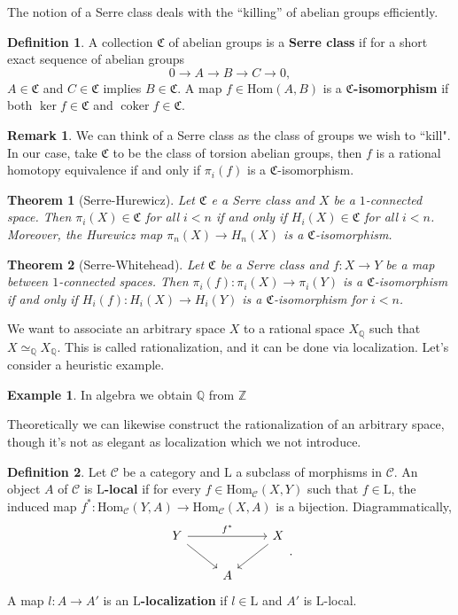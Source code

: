 \documentclass[psamsfonts]{amsart}
\newtheorem{thm}{Theorem}[section]
\theoremstyle{definition}
\newtheorem{defn}{Definition}[section]
\newtheorem{exmp}{Example}[section]
\newtheorem{rem}{Remark}[section]
\newcommand{\Q}{\mathbb{Q}}
\newcommand{\Z}{\mathbb{Z}}
\newcommand{\Hom}{\mathrm{Hom}}
\DeclareMathOperator{\coker}{coker}
\numberwithin{equation}{section}
\begin{document}
The notion of a Serre class deals with the ``killing'' of abelian groups efficiently.

\begin{defn}
A collection $\mathfrak{C}$ of abelian groups is a \textbf{Serre class} if for a short exact sequence of abelian groups
\[0\rightarrow A\to B\to C\to0,\]
$A\in\mathfrak{C}$ and $C\in\mathfrak{C}$ implies $B\in\mathfrak{C}$. A map $f\in\Hom(A,B)$ is a \textbf{$\mathfrak{C}$-isomorphism} if both $\ker f\in\mathfrak{C}$ and $\coker f\in\mathfrak{C}$.
\end{defn}

\begin{rem}
We can think of a Serre class as the class of groups we wish to ``kill". In our case, take $\mathfrak{C}$ to be the class of torsion abelian groups, then $f$ is a rational homotopy equivalence if and only if $\pi_i(f)$ is a $\mathfrak{C}$-isomorphism.
\end{rem}

\begin{thm}[Serre-Hurewicz]
Let $\mathfrak{C}$ e a Serre class and $X$ be a $1$-connected space. Then $\pi_i(X)\in\mathfrak{C}$ for all $i<n$ if and only if $H_i(X)\in\mathfrak{C}$ for all $i<n$. Moreover, the Hurewicz map $\pi_n(X)\to H_n(X)$ is a $\mathfrak{C}$-isomorphism.
\end{thm}

\begin{thm}[Serre-Whitehead]
Let $\mathfrak{C}$ be a Serre class and $f:X\to Y$ be a map between $1$-connected spaces. Then $\pi_i(f):\pi_i(X)\to\pi_i(Y)$ is a $\mathfrak{C}$-isomorphism if and only if $H_i(f):H_i(X)\to H_i(Y)$ is a $\mathfrak{C}$-isomorphism for $i<n$.
\end{thm}

We want to associate an arbitrary space $X$ to a rational space $X_\Q$ such that $X\simeq_\Q X_\Q$. This is called rationalization, and it can be done via localization. Let's consider a heuristic example.

\begin{exmp}

In algebra we obtain $\Q$ from $\Z$

Theoretically we can likewise construct the rationalization of an arbitrary space, though it's not as elegant as localization which we not introduce.
\end{exmp}

\begin{defn}
Let $\mathcal{C}$ be a category and $\mathrm{L}$ a subclass of morphisms in $\mathcal{C}$. An object $A$ of $\mathcal{C}$ is \textbf{$\mathrm{L}$-local} if for every $f\in\Hom_\mathcal{C}(X,Y)$ such that $f\in\mathrm{L}$, the induced map $f^\ast:\Hom_\mathcal{C}(Y,A)\to\Hom_\mathcal{C}(X,A)$ is a bijection. Diagrammatically,
\[\begin{tikzcd}
Y\arrow[dr]\arrow[rr,"f^\ast"]&&X\arrow[dl]\\
&A
\end{tikzcd}.\]
A map $l:A\to A'$ is an \textbf{$\mathrm{L}$-localization} if $l\in\mathrm{L}$ and $A'$ is $\mathrm{L}$-local.
\end{defn}
\end{document}
